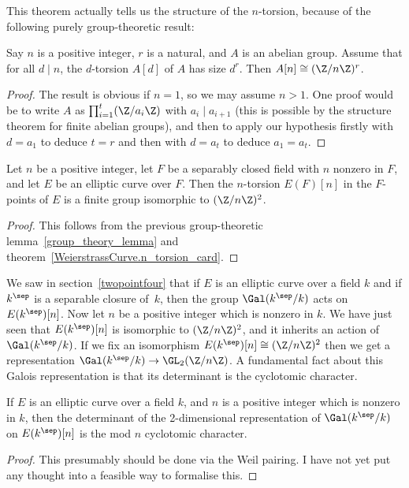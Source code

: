 This theorem actually tells us the structure of the $n$-torsion, because of the following
purely group-theoretic result:
\begin{lemma}\label{group_theory_lemma}\leanok
  Say $n$ is a positive integer, $r$ is a natural, and $A$ is an abelian group. Assume that for all $d\mid n$, the $d$-torsion $A[d]$ of $A$ has size $d^r$. Then $A[n]\cong (\Z/n\Z)^r$.
\end{lemma}
\begin{proof}\leanok
  The result is obvious if $n=1$, so we may assume $n>1$. One proof would be to write $A$ as $\prod_{i=1}^t(\Z/a_i\Z)$
  with $a_i\mid a_{i+1}$ (this is possible by the structure theorem for finite abelian groups), and then to apply our hypothesis firstly with $d=a_1$ to deduce $t=r$ and then with $d=a_t$ to deduce $a_1=a_t$.
\end{proof}

\begin{corollary}\label{Elliptic_curve_n_torsion_2d}\leanok
  Let $n$ be a positive integer, let $F$ be a separably closed
  field with $n$ nonzero in $F$, and let $E$ be an elliptic curve over $F$. Then the $n$-torsion $E(F)[n]$
  in the $F$-points of $E$ is a finite group isomorphic to $(\Z/n\Z)^2$.
\end{corollary}
\begin{proof}\leanok
  This follows from the previous group-theoretic lemma~\ref{group_theory_lemma} and
  theorem~\ref{WeierstrassCurve.n_torsion_card}.
\end{proof}

We saw in section~\ref{twopointfour} that if $E$ is an elliptic curve over a field $k$ and if $k^{\sep}$ is a separable closure of~$k$, then the group $\Gal(k^{\sep}/k)$ acts on $E(k^{\sep})[n]$. Now let $n$ be a positive integer which is nonzero in $k$. We have just seen that $E(k^{\sep})[n]$ is isomorphic to $(\Z/n\Z)^2$, and it inherits an action of $\Gal(k^{\sep}/k)$. If we fix an isomorphism $E(k^{\sep})[n]\cong(\Z/n\Z)^2$ then we get a representation $\Gal(k^{\sep}/k)\to\GL_2(\Z/n\Z)$. A fundamental fact about this Galois representation is that its determinant is the cyclotomic character.

\begin{theorem}\label{Elliptic_curve_det_n_torsion} If $E$ is an elliptic curve over a field $k$, and $n$ is a positive integer which is nonzero in $k$, then the determinant of the 2-dimensional representation of $\Gal(k^{\sep}/k)$ on $E(k^{\sep})[n]$ is the mod $n$ cyclotomic character.
\end{theorem}
\begin{proof}
  This presumably should be done via the Weil pairing. I have not yet put any thought into a feasible way to formalise this.
\end{proof}

